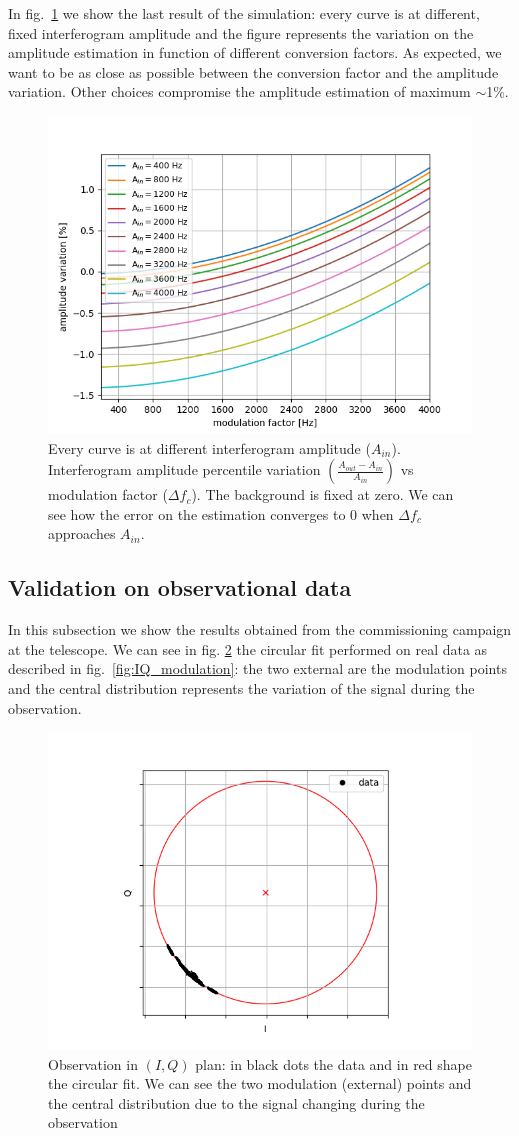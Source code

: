 \documentclass[twocolumn,traditabstract]{aa}\\
\begin{document}
\noindent In fig.~\ref{fig:amp_mod} we show the last result of the simulation: every curve is at different, fixed interferogram amplitude and the figure represents the variation on the amplitude estimation in function of different conversion factors. As expected, we want to be as close as possible between the conversion factor and the amplitude variation. Other choices compromise the amplitude estimation of maximum $\sim$1\%.

\begin{figure}[htf]
	\centering
 	\includegraphics[width=.5\textwidth]{3.acqui/several_modulations.png}
	\caption{Every curve is at different interferogram amplitude ($A_{in}$). Interferogram amplitude percentile variation $\left( \frac{A_{out}-A_{in}}{A_{in}} \right)$ vs modulation factor ($\Delta f_c$).  The background is fixed at zero. We can see how the error on the estimation converges to 0 when $\Delta f_c$ approaches $A_{in}$. }
	\label{fig:amp_mod}
\end{figure}


\subsection{Validation on observational data}
In this subsection we show the results obtained from the commissioning campaign at the telescope. We can see in fig. \ref{fig:circle} the circular fit performed on real data as described in fig.~\ref{fig:IQ_modulation}: the two external are the modulation points and the central distribution represents the variation of the signal during the observation.


\begin{figure}[htf]
	\centering
	\includegraphics[width=.5\textwidth]{4.results/circular_fit.png}
	\caption{Observation in $(I,Q)$ plan: in black dots the data and in red shape the circular fit. We can see the two modulation (external) points and the central distribution due to the signal changing during the observation}
	\label{fig:circle}
\end{figure}
\end{document}
